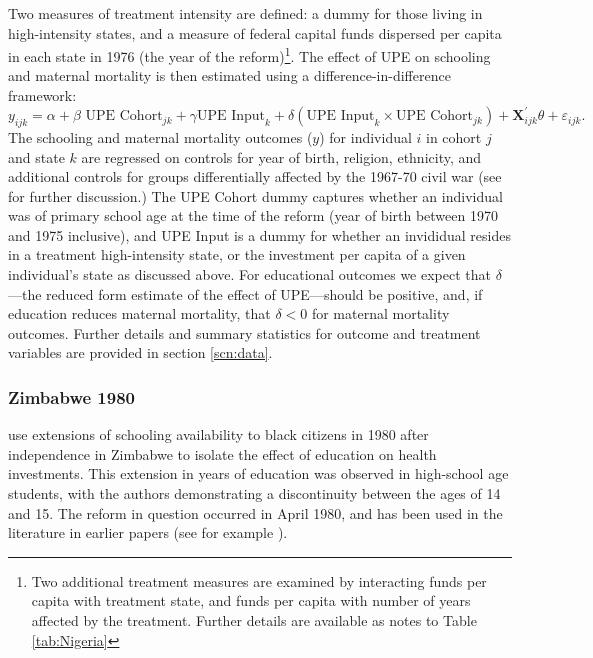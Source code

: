 \documentclass{article}[12pt,subeqn]
\begin{document}
\begin{spacing}{1.4}
Two measures of treatment intensity are defined: a dummy for those living in high-intensity states, and a measure 
of federal capital funds dispersed per capita in each state in 1976 (the year of the reform)\footnote{Two additional
treatment measures are examined by interacting funds per capita with treatment state, and funds per capita with number
of years affected by the treatment.  Further details are available as notes to Table \ref{tab:Nigeria}}.  The effect 
of UPE on schooling and maternal mortality is then estimated using a difference-in-difference framework:
\begin{equation}
 \label{eqn:Nigeria}
 y_{ijk}=\alpha + \beta \text{ UPE Cohort}_{jk}+\gamma \text{UPE Input}_k+\delta(\text{UPE Input}_k\times\text{UPE Cohort}_{jk})+\textbf{X}^\prime_{ijk}\theta+\varepsilon_{ijk}.
\end{equation}
The schooling and maternal mortality outcomes ($y$) for individual $i$ in cohort $j$ and state $k$ are regressed
on controls for year of birth, religion, ethnicity, and additional controls for groups differentially affected by
the 1967-70 civil war (see \citet{Akreshetal2012} for further discussion.)  The UPE Cohort dummy captures whether
an individual was of primary school age at the time of the reform (year of birth between 1970 and 1975 inclusive),
and UPE Input is a dummy for whether an invididual resides in a treatment high-intensity state, or the investment 
per capita of a given individual's state as discussed above.  For educational outcomes we expect that $\delta$---the 
reduced form estimate of the effect of UPE---should be positive, and, if education reduces maternal mortality, that 
$\delta<0$ for maternal mortality outcomes.  Further details and summary statistics for outcome and treatment
variables are provided in section \ref{scn:data}.

\subsubsection{Zimbabwe 1980}
\label{ssscn:empiricsZimbabwe}
\citet{AgueroBharawadj2011} use extensions of schooling availability to black citizens in 1980 after
independence in Zimbabwe to isolate the effect of education on health investments. This extension in years
of education was observed in high-school age students, with the authors demonstrating a discontinuity
between the ages of 14 and 15.  The reform in question occurred in April 1980, and has been used in the 
literature in earlier papers (see for example \citet{Edwards1995}).


\end{spacing}
\end{document}
